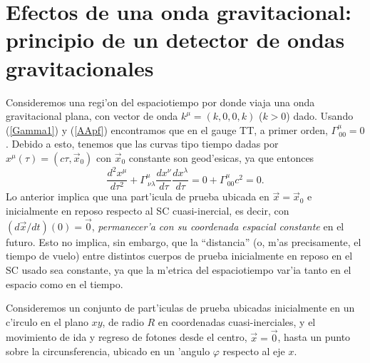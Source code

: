 \section{Efectos de una onda gravitacional: principio de un detector de ondas gravitacionales}
Consideremos una regi'on del espaciotiempo por donde viaja una onda gravitacional plana, con vector de onda $k^\mu=(k,0,0,k)$ ($k>0$) dado. Usando (\ref{Gamma1}) y (\ref{AApf}) encontramos que en el gauge TT, a primer orden, $\Gamma^\mu_{\ 00}=0$.
Debido a esto, tenemos que las curvas tipo tiempo dadas por $x^\mu(\tau)=(c\tau,\vec{x}_0)$ con $\vec{x}_0$ constante son geod'esicas, ya que entonces
\begin{equation}
 \frac{d^2x^\mu}{d\tau^2}+\Gamma^\mu_{\ \nu\lambda}\frac{dx^\nu}{d\tau} \frac{dx^\lambda}{d\tau}=0+\Gamma^\mu_{\ 00}c^2=0.
\end{equation}
Lo anterior implica que una part'icula de prueba ubicada en $\vec{x}=\vec{x}_0$ e inicialmente en reposo respecto al SC cuasi-inercial,  es decir, con  $(d\vec{x}/dt)(0)=\vec{0}$, \textit{permanecer'a con su coordenada espacial constante} en el futuro. Esto no implica, sin embargo, que la ``distancia'' (o, m'as precisamente, el tiempo de vuelo) entre distintos cuerpos de prueba inicialmente en reposo en el SC usado sea constante, ya que la m'etrica del espaciotiempo var'ia tanto en el espacio como en el tiempo.

Consideremos un conjunto de part'iculas de prueba ubicadas inicialmente en un c'irculo en el plano $xy$, de radio $R$ en coordenadas cuasi-inerciales, y el movimiento de ida y regreso de fotones desde el centro, $\vec{x}=\vec{0}$, hasta un punto sobre la circunsferencia, ubicado en un 'angulo $\varphi$ respecto al eje $x$.

